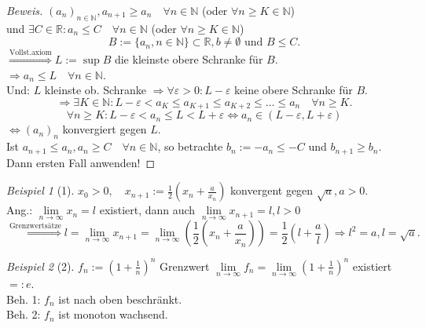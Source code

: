 \documentclass[12pt,a4paper,titlepage]{article} %
\theoremstyle{definition}
\theoremstyle{remark}
\newtheorem*{bsp}{Beispiel}
\newenvironment{bew}{\begin{proof}[Beweis]}{\end{proof}}
\newcommand{\N}{\mathbb{N}}
\newcommand{\R}{\mathbb{R}}
\newcommand{\limes}[1]{\lim\limits_{#1\rightarrow\infty}}
\begin{document}
\begin{bew}
	\((a_n)_{n\in\N}, a_{n+1} \geq a_n \quad \forall n\in\N \) (oder \( \forall n\geq K \in\N \))\\
	und \( \exists C\in\R: a_n \leq C \quad \forall n\in\N \) (oder \( \forall n\geq K \in\N \))\\
	\[ B:= \{a_n, n\in\N\} \subset \R, b\neq \emptyset \text{ und } B\leq C. \]
	\(\overset{\text{Vollst.axiom}}{\Rightarrow} L := \sup B\) die kleinste obere Schranke für \(B\).\\
	\(\Rightarrow a_n \leq L \quad \forall n\in\N \).\\
	Und: \(L\) kleinste ob. Schranke \( \Rightarrow \forall \varepsilon>0: L-\varepsilon \) keine obere Schranke für \(B\).\\
	\[ \Rightarrow \exists K \in\N: L-\varepsilon < a_K \leq a_{K+1} \leq a_{K+2} \leq \ldots \leq a_n \quad \forall n\geq K. \]
	\[ \forall n\geq K: L-\varepsilon < a_n \leq L < L + \varepsilon \Leftrightarrow a_n \in (L-\varepsilon, L + \varepsilon) \]
	\( \Leftrightarrow (a_n)_n \) konvergiert gegen \(L\).\\
	Ist \(a_{n+1} \leq a_n, a_n\geq C \quad \forall n\in\N \), so betrachte \(b_n := -a_n \leq -C \) und \(b_{n+1} \geq b_n\). Dann ersten Fall anwenden!
\end{bew}
\begin{bsp}[1]
	\(x_0 > 0, \quad x_{n+1} := \frac{1}{2} \left( x_n + \frac{a}{x_n} \right) \) konvergent gegen \(\sqrt{a}, a>0 \).\\
	Ang.: \( \limes{n} x_n = l \) existiert, dann auch \( \limes{n} x_{n+1} = l, l>0 \)
	\[ \overset{\text{Grenzwertsätze}}{\Longrightarrow} l = \limes{n} x_{n+1} = \limes{n} \left( \frac{1}{2} \left(x_n + \frac{a}{x_n} \right) \right) = \frac{1}{2} \left( l + \frac{a}{l} \right) \Rightarrow l^2 = a, l = \sqrt{a}. \]
\end{bsp}
\begin{bsp}[2]
	\(f_n := \left( 1 + \frac{1}{n} \right)^n \) Grenzwert \( \limes{n} f_n = \limes{n} \left( 1 + \frac{1}{n} \right)^n \) existiert \( =: e \).\\
	Beh. 1: \( f_n\) ist nach oben beschränkt.\\
	Beh. 2: \( f_n\) ist monoton wachsend.
\end{bsp}
\end{document}
